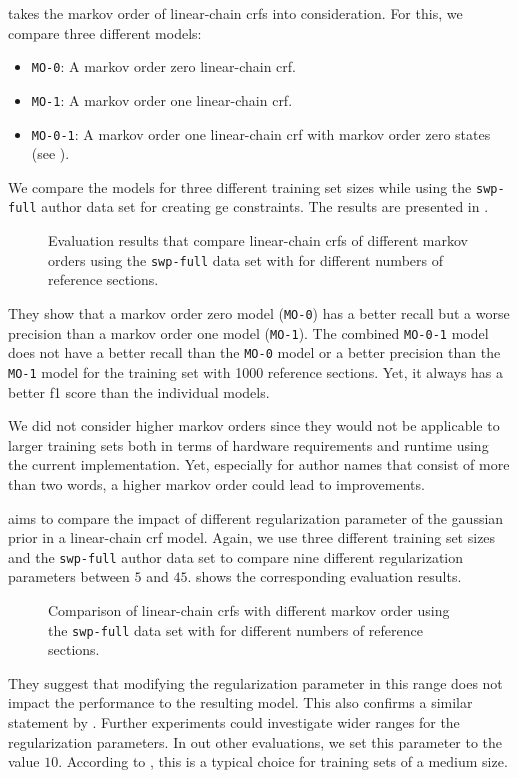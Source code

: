  takes the \gls{markov order} of \glspl{linear-chain crf} into consideration.
For this, we compare three different models:
\begin{itemize}
  \item \texttt{MO-0}: A \gls{markov order} zero \gls{linear-chain crf}.
  \item \texttt{MO-1}: A \gls{markov order} one \gls{linear-chain crf}.
  \item \texttt{MO-0-1}: A \gls{markov order} one \gls{linear-chain crf} with \gls{markov order} zero states (see ).
\end{itemize}
We compare the models for three different training set sizes while using the \texttt{swp-full} author data set for creating \gls{ge} constraints.
The results are presented in .
\begin{figure}

\caption{Evaluation results that compare \glspl{linear-chain crf} of different \glspl{markov order} using the \texttt{swp-full} data set with for different numbers of reference sections.}
\label{fig:eval-markov-orders}
\end{figure}
They show that a \gls{markov order} zero model (\texttt{MO-0}) has a better \gls{recall} but a worse \gls{precision} than a \gls{markov order} one model (\texttt{MO-1}).
The combined \texttt{MO-0-1} model does not have a better recall than the \texttt{MO-0} model or a better precision than the \texttt{MO-1} model for the training set with \num{1000} reference sections.
Yet, it always has a better \gls{f1 score} than the individual models.

We did not consider higher \glspl{markov order} since they would not be applicable to larger training sets both in terms of hardware requirements and runtime using the current implementation.
Yet, especially for author names that consist of more than two words, a higher \gls{markov order} could lead to improvements.

\bigskip

 aims to compare the impact of different \gls{regularization parameter} of the \gls{gaussian prior} in a \gls{linear-chain crf} model.
Again, we use three different training set sizes and the \texttt{swp-full} author data set to compare nine different \glspl{regularization parameter} between $5$ and $45$.
 shows the corresponding evaluation results.
\begin{figure}

\caption{Comparison of \glspl{linear-chain crf} with different \gls{markov order} using the \texttt{swp-full} data set with for different numbers of reference sections.}
\label{fig:eval-gaussian}
\end{figure}
They suggest that modifying the \gls{regularization parameter} in this range does not impact the performance to the resulting model.
This also confirms a similar statement by \citet{sutton2010introduction}.
Further experiments could investigate wider ranges for the \glspl{regularization parameter}.
In out other evaluations, we set this parameter to the value $10$.
According to \citet{sutton2010introduction}, this is a typical choice for training sets of a medium size.


